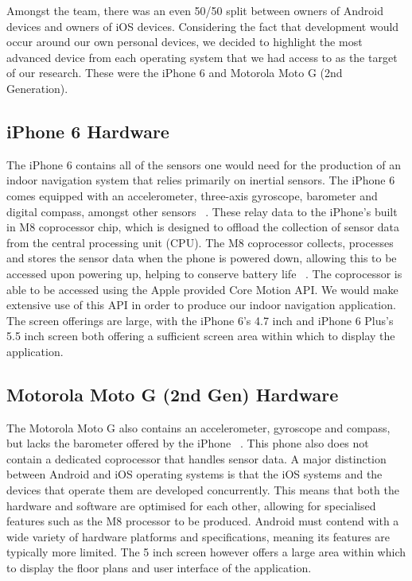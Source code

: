 \documentclass[12pt,a4paper]{report}
\begin{document}
Amongst the team, there was an even 50/50 split between owners of Android devices and owners of iOS devices. Considering the fact that development would occur around our own personal devices, we decided to highlight the most advanced device from each operating system that we had access to as the target of our research. These were the iPhone 6 and Motorola Moto G (2nd Generation).

\subsection{iPhone 6 Hardware}

The iPhone 6 contains all of the sensors one would need for the production of an indoor navigation system that relies primarily on inertial sensors. The iPhone 6 comes equipped with an accelerometer, three-axis gyroscope, barometer and digital compass, amongst other sensors ~\cite{iosSpecs}. These relay data to the iPhone's built in M8 coprocessor chip, which is designed to offload the collection of sensor data from the central processing unit (CPU). The M8 coprocessor collects, processes and stores the sensor data when the phone is powered down, allowing this to be accessed upon powering up, helping to conserve battery life ~\cite{m8}. The coprocessor is able to be accessed using the Apple provided Core Motion API. We would make extensive use of this API in order to produce our indoor navigation application. The screen offerings are large, with the iPhone 6's 4.7 inch and iPhone 6 Plus's 5.5 inch screen both offering a sufficient screen area within which to display the application.

\subsection{Motorola Moto G (2nd Gen) Hardware}

The Motorola Moto G also contains an accelerometer, gyroscope and compass, but lacks the barometer offered by the iPhone ~\cite{motoSpecs}. This phone also does not contain a dedicated coprocessor that handles sensor data. A major distinction between Android and iOS operating systems is that the iOS systems and the devices that operate them are developed concurrently. This means that both the hardware and software are optimised for each other, allowing for specialised features such as the M8 processor to be produced. Android must contend with a wide variety of hardware platforms and specifications, meaning its features are typically more limited. The 5 inch screen however offers a large area within which to display the floor plans and user interface of the application.
\end{document}
